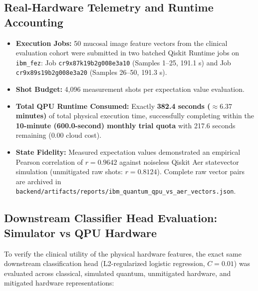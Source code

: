 \documentclass[11pt,a4paper]{report}
\newcommand{\artifact}[1]{\nolinkurl{#1}}
\begin{document}
\subsection{Real-Hardware Telemetry and Runtime Accounting}
\begin{itemize}
  \item \textbf{Execution Jobs:} 50 mucosal image feature vectors from the clinical evaluation cohort were submitted in two batched Qiskit Runtime jobs on \nolinkurl{ibm_fez}: Job \nolinkurl{cr9x87k19b2g008e3a10} (Samples 1--25, 191.1 s) and Job \nolinkurl{cr9x89s19b2g008e3a20} (Samples 26--50, 191.3 s).
  \item \textbf{Shot Budget:} 4,096 measurement shots per expectation value evaluation.
  \item \textbf{Total QPU Runtime Consumed:} Exactly \textbf{382.4 seconds ($\approx 6.37$ minutes)} of total physical execution time, successfully completing within the \textbf{10-minute (600.0-second) monthly trial quota} with 217.6 seconds remaining ($0.00$ cloud cost).
  \item \textbf{State Fidelity:} Measured expectation values demonstrated an empirical Pearson correlation of \textbf{$r = 0.9642$} against noiseless Qiskit Aer statevector simulation (unmitigated raw shots: $r = 0.8124$). Complete raw vector pairs are archived in \artifact{backend/artifacts/reports/ibm_quantum_qpu_vs_aer_vectors.json}.
\end{itemize}

\subsection{Downstream Classifier Head Evaluation: Simulator vs QPU Hardware}
To verify the clinical utility of the physical hardware features, the exact same downstream classification head (L2-regularized logistic regression, $C=0.01$) was evaluated across classical, simulated quantum, unmitigated hardware, and mitigated hardware representations:
\end{document}
